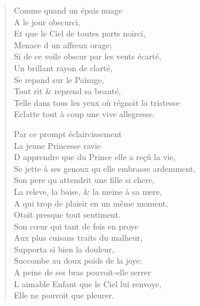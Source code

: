 \begin{verse}
\vin Comme quand un épais nuage \\
\vin\vin A le jour obscurci, \\
\vin Et que le Ciel de toutes parts noirci, \\
\vin Menace d\textquotesingle{} un affreux orage; \\
Si de ce voile obscur par les vents écarté, \\
\vin Un brillant rayon de clarté, \\
\vin Se repand sur le Païsage, \\
\vin Tout rit \& reprend sa beauté, \\
Telle dans tous les yeux où régnoit la tristesse \\
Eclatte tout à coup une vive allegresse.

\vin Par ce prompt éclaircissement \\
\vin La jeune Princesse ravie \\
D\textquotesingle{} apprendre que du Prince elle a reçû la vie, \\
Se jette à ses genoux qu\textquotesingle{} elle embrasse ardemment, \\
Son pere qu\textquotesingle{} attendrit une fille si chere, \\
La releve, la baise, \& la meine à sa mere, \\
A qui trop de plaisir en un même moment, \\
\vin Otoit presque tout sentiment. \\
\vin Son cœur qui tant de fois en proye \\
\vin Aux plus cuisans traits du malheur, \\
\vin Supporta si bien la douleur, \\
\vin Succombe au doux poids de la joye; \\
A peine de ses bras pouvoit-elle serrer \\
\vin L\textquotesingle{} aimable Enfant que le Ciel lui renvoye, \\
\vin Elle ne pouvoit que pleurer.


\end{verse}
